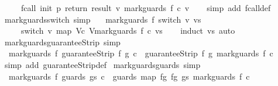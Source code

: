 \begin{isabellebody}
\ \ \ \ \ fcall\ init\ p\ return\ result\ {\isacharparenleft}{\isasymlambda}v{\isachardot}\ mark{\isacharunderscore}guards\ f\ {\isacharparenleft}c\ v{\isacharparenright}{\isacharparenright}{\isachardoublequoteclose}\isanewline
%
\isadelimproof
\ \ %
\endisadelimproof
%
\isatagproof
{}\isamarkupfalse%
\ {\isacharparenleft}simp\ add{\isacharcolon}\ fcall{\isacharunderscore}def{\isacharparenright}%
\endisatagproof
{\isafoldproof}%
%
\isadelimproof
\isanewline
%
\endisadelimproof
\isanewline
{}\isamarkupfalse%
\ mark{\isacharunderscore}guards{\isacharunderscore}switch\ {\isacharbrackleft}simp{\isacharbrackright}{\isacharcolon}\ \isanewline
\ \ {\isachardoublequoteopen}mark{\isacharunderscore}guards\ f\ {\isacharparenleft}switch\ v\ vs{\isacharparenright}\ {\isacharequal}\ \isanewline
\ \ \ \ \ switch\ v\ {\isacharparenleft}map\ {\isacharparenleft}{\isasymlambda}{\isacharparenleft}V{\isacharcomma}c{\isacharparenright}{\isachardot}\ {\isacharparenleft}V{\isacharcomma}mark{\isacharunderscore}guards\ f\ c{\isacharparenright}{\isacharparenright}\ vs{\isacharparenright}{\isachardoublequoteclose}\isanewline
%
\isadelimproof
\ \ %
\endisadelimproof
%
\isatagproof
{}\isamarkupfalse%
\ {\isacharparenleft}induct\ vs{\isacharparenright}\ auto%
\endisatagproof
{\isafoldproof}%
%
\isadelimproof
\isanewline
%
\endisadelimproof
\isanewline
{}\isamarkupfalse%
\ mark{\isacharunderscore}guards{\isacharunderscore}guaranteeStrip\ {\isacharbrackleft}simp{\isacharbrackright}{\isacharcolon}\isanewline
\ \ {\isachardoublequoteopen}mark{\isacharunderscore}guards\ f\ {\isacharparenleft}guaranteeStrip\ f{\isacharprime}\ g\ c{\isacharparenright}\ {\isacharequal}\ guaranteeStrip\ f\ g\ {\isacharparenleft}mark{\isacharunderscore}guards\ f\ c{\isacharparenright}{\isachardoublequoteclose}\isanewline
%
\isadelimproof
\ \ %
\endisadelimproof
%
\isatagproof
{}\isamarkupfalse%
\ {\isacharparenleft}simp\ add{\isacharcolon}\ guaranteeStrip{\isacharunderscore}def{\isacharparenright}%
\endisatagproof
{\isafoldproof}%
%
\isadelimproof
\isanewline
%
\endisadelimproof
\isanewline
{}\isamarkupfalse%
\ mark{\isacharunderscore}guards{\isacharunderscore}guards\ {\isacharbrackleft}simp{\isacharbrackright}{\isacharcolon}\ \isanewline
\ \ {\isachardoublequoteopen}mark{\isacharunderscore}guards\ f\ {\isacharparenleft}guards\ gs\ c{\isacharparenright}\ {\isacharequal}\ guards\ {\isacharparenleft}map\ {\isacharparenleft}{\isasymlambda}{\isacharparenleft}f{\isacharprime}{\isacharcomma}g{\isacharparenright}{\isachardot}\ {\isacharparenleft}f{\isacharcomma}g{\isacharparenright}{\isacharparenright}\ gs{\isacharparenright}\ {\isacharparenleft}mark{\isacharunderscore}guards\ f\ c{\isacharparenright}{\isachardoublequoteclose}\isanewline

\end{isabellebody}
